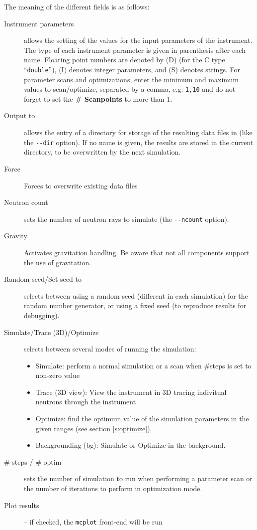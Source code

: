 The meaning of the different fields is as follows:
\begin{description}
\item[Instrument parameters] allows the setting of the values for
  the input parameters of the instrument. The type of each instrument
  parameter is given in parenthesis after each name. Floating point
  numbers are denoted by (D) (for the C type ``\verb+double+''), (I)
  denotes integer parameters, and (S) denotes strings. For parameter scans and optimizations, enter the minimum and maximum values to scan/optimize, separated by a comma, e.g. \verb+1,10+ and do not forget to set the {\bf \# Scanpoints} to more than 1.
\item[Output to] allows the entry of a directory for storage of the
  resulting data files in (like the \verb+--dir+ option). If no name is
  given, the results are stored in the current directory, to be overwritten
  by the next simulation.
\item[Force] Forces to overwrite existing data files
\item[Neutron count] sets the number of neutron rays to
  simulate (the \verb+--ncount+ option).
\item[Gravity] Activates gravitation handling. Be aware that not all
    components support the use of gravitation.
\item[Random seed/Set seed to] selects between using a random seed (different
  in each simulation) for the random number generator, or using a fixed
  seed (to reproduce results for debugging).
\item[Simulate/Trace (3D)/Optimize] selects between several modes of
  running the simulation:
  \begin{itemize}
  \item Simulate: perform a normal simulation or a scan when \#steps
    is set to non-zero value
  \item Trace (3D view): View the instrument in 3D tracing indivitual
    neutrons through the instrument
  \item Optimize: find the optimum value of the simulation parameters
    in the given ranges (see section \ref{s:optimize}).
  \item Backgrounding (bg): Simulate or Optimize in the background.
\end{itemize}
\item[\# steps / \# optim] sets the number of simulation to run when
  performing a parameter scan or the number of iterations to
  perform in optimization mode.
\item[Plot results] -- if checked, the \verb+mcplot+ front-end will be run

\end{description}

